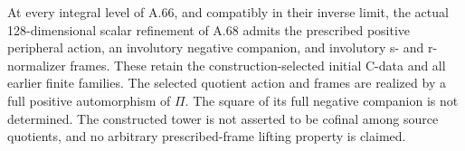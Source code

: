 At every integral level of A.66, and compatibly in their inverse limit,
the actual 128-dimensional scalar refinement of A.68 admits the
prescribed positive peripheral action,
an involutory negative companion, and involutory s- and r-normalizer
frames. These retain the construction-selected initial C-data and
all earlier finite families. The selected quotient action and frames
are realized by a full positive automorphism of \(\Pi\).
The square of its full negative companion is not determined.
The constructed tower is not asserted to be cofinal among source
quotients, and no arbitrary prescribed-frame lifting property is claimed.

